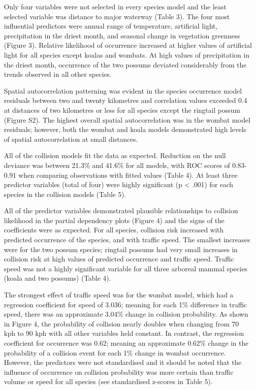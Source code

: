 Only four variables were not selected in every species model and the least selected variable was distance to major waterway (Table 3). The four most influential predictors were annual range of temperature, artificial light, precipitation in the driest month, and seasonal change in vegetation greenness (Figure 3). Relative likelihood of occurrence increased at higher values of artificial light for all species except koalas and wombats. At high values of precipitation in the driest month, occurrence of the two possums deviated considerably from the trends observed in all other species. 

Spatial autocorrelation patterning was evident in the species occurrence model residuals between two and twenty kilometres and correlation values exceeded 0.4 at distances of two kilometres or less for all species except the ringtail possum (Figure S2). The highest overall spatial autocorrelation was in the wombat model residuals; however, both the wombat and koala models demonstrated high levels of spatial autocorrelation at small distances.

All of the collision models fit the data as expected.  Reduction on the null deviance was between 21.3\% and 41.6\% for all models, with ROC scores of 0.83-0.91 when comparing observations with fitted values (Table 4). At least three predictor variables (total of four) were highly significant (p < .001) for each species in the collision models (Table 5).

All of the predictor variables demonstrated plausible relationships to collision likelihood in the partial dependency plots (Figure 4) and the signs of the coefficients were as expected. For all species, collision risk increased with predicted occurrence of the species, and with traffic speed. The smallest increases were for the two possum species; ringtail possums had very small increases in collision risk at high values of predicted occurrence and traffic speed.  Traffic speed was not a highly significant variable for all three arboreal mammal species (koala and two possums) (Table 4).

The strongest effect of traffic speed was for the wombat model, which had a regression coefficient for speed of 3.036; meaning for each 1\% difference in traffic speed, there was an approximate 3.04\% change in collision probability. As shown in Figure 4, the probability of collision nearly doubles when changing from 70 kph to 90 kph with all other variables held constant. In contrast, the regression coefficient for occurrence was 0.62; meaning an approximate 0.62\% change in the probability of a collision event for each 1\% change in wombat occurrence. However, the predictors were not standardised and it should be noted that the influence of occurrence on collision probability was more certain than traffic volume or speed for all species (see standardised z-scores in Table 5).

